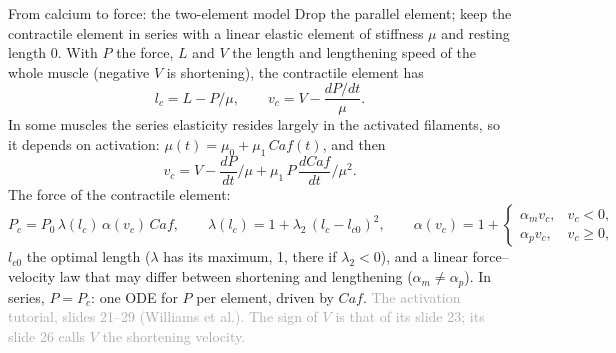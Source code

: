 \documentclass[aspectratio=169,11pt]{beamer}
\newcommand{\sourcecredit}[1]{\vfill\hfill{\tiny\textcolor{DarkGray}{#1}}}
\begin{document}
\begin{frame}{From calcium to force: the two-element model}
\label{fr:twoel}
\small
Drop the parallel element; keep the contractile element in series with a linear elastic element of stiffness $\mu$ and resting length 0. With $P$ the force, $L$ and $V$ the length and lengthening speed of the whole muscle (negative $V$ is shortening), the contractile element has
\[ l_c = L - P/\mu, \qquad v_c = V - \frac{dP/dt}{\mu}. \]
In some muscles the series elasticity resides largely in the activated filaments, so it depends on activation: $\mu(t) = \mu_0 + \mu_1\,Caf(t)$, and then
\[ v_c = V - \frac{dP}{dt}\Big/\mu + \mu_1\,P\,\frac{dCaf}{dt}\Big/\mu^2. \]
The force of the contractile element:
\[ P_c = P_0\,\lambda(l_c)\,\alpha(v_c)\,Caf, \qquad \lambda(l_c) = 1 + \lambda_2\,(l_c - l_{c0})^2, \qquad \alpha(v_c) = 1 + \begin{cases} \alpha_m v_c, & v_c < 0, \\ \alpha_p v_c, & v_c \ge 0, \end{cases} \]
$l_{c0}$ the optimal length ($\lambda$ has its maximum, 1, there if $\lambda_2 < 0$), and a linear force--velocity law that may differ between shortening and lengthening ($\alpha_m \ne \alpha_p$). In series, $P = P_c$: one ODE for $P$ per element, driven by $Caf$.
\sourcecredit{The activation tutorial, slides 21--29 (Williams et al.). The sign of $V$ is that of its slide 23; its slide 26 calls $V$ the shortening velocity.}
\end{frame}
\end{document}
